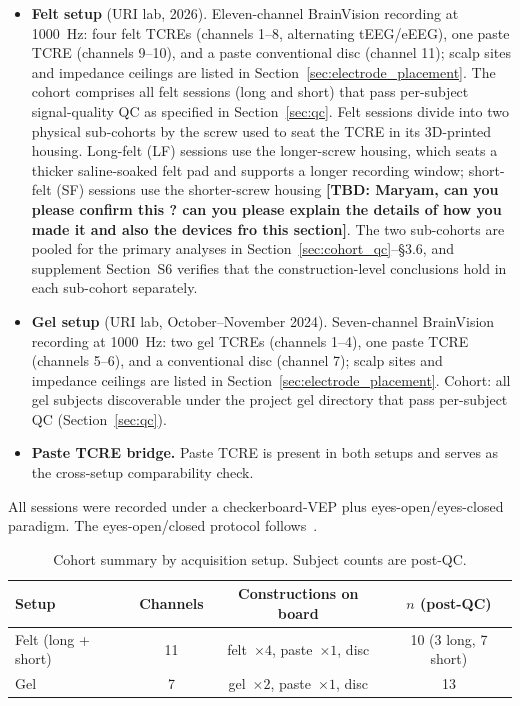 \documentclass[10pt,a4paper]{article}
\newcommand{\TBD}[1]{{\color{red}\textbf{[TBD: #1]}}}
\begin{document}
\begin{itemize}
\item \textbf{Felt setup} (URI lab, 2026). Eleven-channel BrainVision recording at 1000~Hz: four felt TCREs (channels 1--8, alternating tEEG/eEEG), one paste TCRE (channels 9--10), and a paste conventional disc (channel 11); scalp sites and impedance ceilings are listed in Section~\ref{sec:electrode_placement}. The cohort comprises all felt sessions (long and short) that pass per-subject signal-quality QC as specified in Section~\ref{sec:qc}. Felt sessions divide into two physical sub-cohorts by the screw used to seat the TCRE in its 3D-printed housing. Long-felt (LF) sessions use the longer-screw housing, which seats a thicker saline-soaked felt pad and supports a longer recording window; short-felt (SF) sessions use the shorter-screw housing \TBD{ Maryam, can you please confirm this ? can you please explain the details of how you made it and also the devices fro this section}. The two sub-cohorts are pooled for the primary analyses in Section~\ref{sec:cohort_qc}--§3.6, and supplement Section~S6 verifies that the construction-level conclusions hold in each sub-cohort separately.
\item \textbf{Gel setup} (URI lab, October--November 2024). Seven-channel BrainVision recording at 1000~Hz: two gel TCREs (channels 1--4), one paste TCRE (channels 5--6), and a conventional disc (channel 7); scalp sites and impedance ceilings are listed in Section~\ref{sec:electrode_placement}. Cohort: all gel subjects discoverable under the project gel directory that pass per-subject QC (Section~\ref{sec:qc}).
\item \textbf{Paste TCRE bridge.} Paste TCRE is present in both setups and serves as the cross-setup comparability check.
\end{itemize}

All sessions were recorded under a checkerboard-VEP plus eyes-open/eyes-closed paradigm. The eyes-open/closed protocol follows~\cite{kirschfeld2005}.

\begin{table}[H]
\caption{Cohort summary by acquisition setup. Subject counts are post-QC.}
\label{tab:cohort}
\centering
\begin{tabular}{lccc}
\toprule
\textbf{Setup} & \textbf{Channels} & \textbf{Constructions on board} & \textbf{$n$ (post-QC)} \\
\midrule
Felt (long + short) & 11 & felt~$\times 4$, paste~$\times 1$, disc & 10 (3 long, 7 short) \\
Gel                  &  7 & gel~$\times 2$, paste~$\times 1$, disc  & 13 \\
\bottomrule
\end{tabular}
\end{table}
\end{document}
